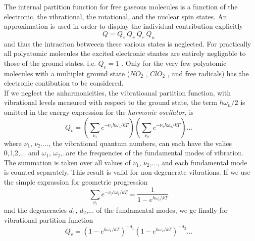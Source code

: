 {The internal partition function for free gaseous molecules is  a
function of the electronic, the vibrational, the rotational, and the
nuclear spin states. An approximation is used in order to display the
individual contribution explicitly
\begin{equation}
 Q=Q_e~Q_v~Q_r~Q_n
\label{}
\end{equation}
and thus the intraciton betweeen these various states is neglected. For
practically all polyatomic molecules the excited electronic staates
are entirely negligable to those of the ground states,
i.e. $Q_e=1$ . Only for the very few polyatomic molecules with a
multiplet ground state ($NO_2$ , $ClO_2$ , and free radicals) has the
electronic contibution to be considered.\\
If we neglect the anharmonicities, the vibratioanal partition
function, with vibrational levels measured with respect to the ground
state, the term $h\omega_n/2$ is omitted in the energy expression for
the {\it{harmonic oscilator}\nocorr}, is 
\begin{equation}
 Q_v=\left(\sum_{\nu_1}e^{-\nu_1 h\omega_1/kT}\right)\left(\sum_{\nu_2}e^{-\nu_2 h\omega_2/kT}\right)...
\label{}
\end{equation}
where $\nu_1$, $\nu_2$,..., the vibrational quantum numbers, can each
have the valies 0,1,2,... and $\omega_1$, $\omega_2$,..are the
frequencies of the fundamental modes of vibration. The summation is
taken over all values of $\nu_1$, $\nu_2$,..., and each fundamental
mode is counted separately. This result is valid for non-degenerate
vibrations. If we use the simple exprassion for geometric progression
\begin{equation}
 \sum_{\nu_i}e^{-\nu_i h\omega_i/kT}=\frac{1}{1-e^{h\omega_i/kT}}
\label{}
\end{equation}
and the degeneracies $d_1$, $d_2$,... of the fundamental modes, we ge
finally for vibrational partition function
\begin{equation}
Q_v=\left(1-e^{h\omega_1/kT}\right)^{-d_1}\left(1-e^{h\omega_2/kT}\right)^{-d_2}...
\label{}
\end{equation}

}
